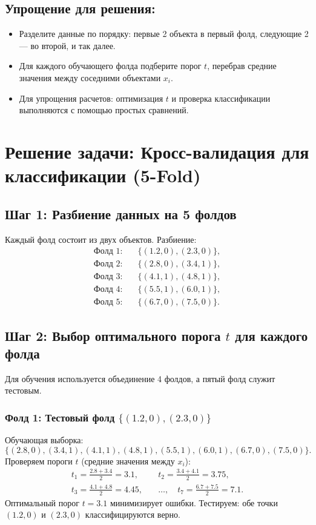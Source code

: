 \subsection*{Упрощение для решения:}
\begin{itemize}
    \item Разделите данные по порядку: первые 2 объекта в первый фолд, следующие 2 — во второй, и так далее.
    \item Для каждого обучающего фолда подберите порог \( t \), перебрав средние значения между соседними объектами \( x_i \).
    \item Для упрощения расчетов: оптимизация \( t \) и проверка классификации выполняются с помощью простых сравнений.
\end{itemize}

\section*{Решение задачи: Кросс-валидация для классификации (5-Fold)}

\subsection*{Шаг 1: Разбиение данных на 5 фолдов}

Каждый фолд состоит из двух объектов. Разбиение:
\[
    \begin{aligned}
        \text{Фолд 1:} & \quad \{(1.2, 0), (2.3, 0)\}, \\
        \text{Фолд 2:} & \quad \{(2.8, 0), (3.4, 1)\}, \\
        \text{Фолд 3:} & \quad \{(4.1, 1), (4.8, 1)\}, \\
        \text{Фолд 4:} & \quad \{(5.5, 1), (6.0, 1)\}, \\
        \text{Фолд 5:} & \quad \{(6.7, 0), (7.5, 0)\}.
    \end{aligned}
\]

\subsection*{Шаг 2: Выбор оптимального порога \( t \) для каждого фолда}

Для обучения используется объединение 4 фолдов, а пятый фолд служит тестовым.

\subsubsection*{Фолд 1: Тестовый фолд \(\{(1.2, 0), (2.3, 0)\}\)}
Обучающая выборка:
\[
    \{(2.8, 0), (3.4, 1), (4.1, 1), (4.8, 1), (5.5, 1), (6.0, 1), (6.7, 0), (7.5, 0)\}.
\]
Проверяем пороги \( t \) (средние значения между \( x_i \)):
\[
    \begin{aligned}
        t_1 = \frac{2.8 + 3.4}{2} = 3.1,  & \quad t_2 = \frac{3.4 + 4.1}{2} = 3.75,             \\
        t_3 = \frac{4.1 + 4.8}{2} = 4.45, & \quad \dots, \quad t_7 = \frac{6.7 + 7.5}{2} = 7.1.
    \end{aligned}
\]
Оптимальный порог \( t = 3.1 \) минимизирует ошибки. Тестируем: обе точки \((1.2, 0)\) и \((2.3, 0)\) классифицируются верно.

